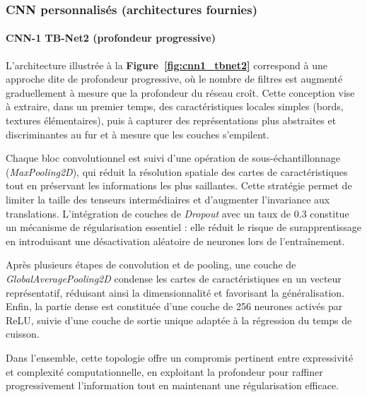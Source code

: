 \subsubsection{CNN personnalisés (architectures fournies)}

\paragraph{CNN-1 TB-Net2 (profondeur progressive)}
L’architecture illustrée à la \textbf{Figure~\ref{fig:cnn1_tbnet2}} correspond à une approche dite de profondeur progressive, où le nombre de filtres est augmenté graduellement à mesure que la profondeur du réseau croît. Cette conception vise à extraire, dans un premier temps, des caractéristiques locales simples (bords, textures élémentaires), puis à capturer des représentations plus abstraites et discriminantes au fur et à mesure que les couches s’empilent.

Chaque bloc convolutionnel est suivi d’une opération de sous-échantillonnage (\textit{MaxPooling2D}), qui réduit la résolution spatiale des cartes de caractéristiques tout en préservant les informations les plus saillantes. Cette stratégie permet de limiter la taille des tenseurs intermédiaires et d’augmenter l’invariance aux translations. L’intégration de couches de \textit{Dropout} avec un taux de 0.3 constitue un mécanisme de régularisation essentiel : elle réduit le risque de surapprentissage en introduisant une désactivation aléatoire de neurones lors de l’entraînement.

Après plusieurs étapes de convolution et de pooling, une couche de \textit{GlobalAveragePooling2D} condense les cartes de caractéristiques en un vecteur représentatif, réduisant ainsi la dimensionnalité et favorisant la généralisation. Enfin, la partie dense est constituée d’une couche de 256 neurones activés par ReLU, suivie d’une couche de sortie unique adaptée à la régression du temps de cuisson.

Dans l’ensemble, cette topologie offre un compromis pertinent entre expressivité et complexité computationnelle, en exploitant la profondeur pour raffiner progressivement l’information tout en maintenant une régularisation efficace.

